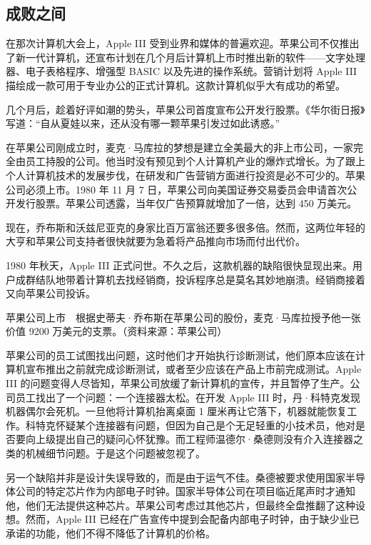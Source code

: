 \documentclass[12pt,UTF8]{ctexbook}
\begin{document}
\subsection{成败之间}


在那次计算机大会上，Apple III 受到业界和媒体的普遍欢迎。苹果公司不仅推出了新一代计算机，还宣布计划在几个月后计算机上市时推出新的软件——文字处理器、电子表格程序、增强型 BASIC 以及先进的操作系统。营销计划将 Apple III 描绘成一款可用于专业办公的正式计算机。这款计算机似乎大有成功的希望。

几个月后，趁着好评如潮的势头，苹果公司首度宣布公开发行股票。《华尔街日报》写道：“自从夏娃以来，还从没有哪一颗苹果引发过如此诱惑。”

在苹果公司刚成立时，麦克·马库拉的梦想是建立全美最大的非上市公司，一家完全由员工持股的公司。他当时没有预见到个人计算机产业的爆炸式增长。为了跟上个人计算机技术的发展步伐，在研发和广告营销方面进行投资是必不可少的。苹果公司必须上市。1980 年 11 月 7 日，苹果公司向美国证券交易委员会申请首次公开发行股票。苹果公司透露，当年仅广告预算就增加了一倍，达到 450 万美元。

现在，乔布斯和沃兹尼亚克的身家比百万富翁还要多很多倍。然而，这两位年轻的大亨和苹果公司支持者很快就要为急着将产品推向市场而付出代价。

1980 年秋天，Apple III 正式问世。不久之后，这款机器的缺陷很快显现出来。用户成群结队地带着计算机去找经销商，投诉程序总是莫名其妙地崩溃。经销商接着又向苹果公司投诉。



苹果公司上市　根据史蒂夫·乔布斯在苹果公司的股份，麦克·马库拉授予他一张价值 9200 万美元的支票。（资料来源：苹果公司）

苹果公司的员工试图找出问题，这时他们才开始执行诊断测试，他们原本应该在计算机宣布推出之前就完成诊断测试，或者至少应该在产品上市前完成测试。Apple III 的问题变得人尽皆知，苹果公司放缓了新计算机的宣传，并且暂停了生产。公司员工找出了一个问题：一个连接器太松。在开发 Apple III 时，丹·科特克发现机器偶尔会死机。一旦他将计算机抬离桌面 1 厘米再让它落下，机器就能恢复工作。科特克怀疑某个连接器有问题，但因为自己是个无足轻重的小技术员，他对是否要向上级提出自己的疑问心怀犹豫。而工程师温德尔·桑德则没有介入连接器之类的机械细节问题。于是这个问题被忽视了。

另一个缺陷并非是设计失误导致的，而是由于运气不佳。桑德被要求使用国家半导体公司的特定芯片作为内部电子时钟。国家半导体公司在项目临近尾声时才通知他，他们无法提供这种芯片。苹果公司考虑过其他芯片，但最终全盘推翻了这种设想。然而，Apple III 已经在广告宣传中提到会配备内部电子时钟，由于缺少业已承诺的功能，他们不得不降低了计算机的价格。
\end{document}
